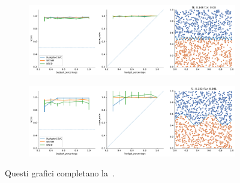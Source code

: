 \begin{appendices}
\begin{figure}
\begin{subfigure}{.5\textwidth}
    \end{subfigure}%
    \hfill
    \begin{subfigure}{.5\textwidth}
        \centering
        \includegraphics[width=\textwidth]{img/comp_old/7.pdf}
    \end{subfigure}
    \begin{subfigure}{.5\textwidth}
        \centering
        \includegraphics[width=\textwidth]{img/comp_old/11.pdf}
    \end{subfigure}%
\caption{Questi grafici completano la~.}
\end{figure}


\end{appendices}

